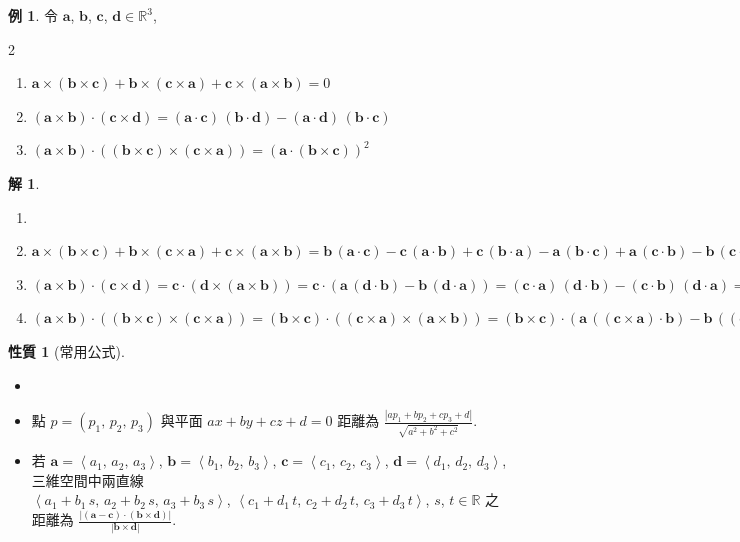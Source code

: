 \documentclass[12pt]{extarticle}
\newcommand{\ds}{\displaystyle}
\newcommand{\llt}{\left\langle}
\newcommand{\rgt}{\right\rangle}
\theoremstyle{definition}
\newtheorem*{prp}{性質}
\newtheorem*{ex}{例}
\newtheorem*{sol}{解}
\newcommand{\va}{\mathbf{a}}
\newcommand{\vb}{\mathbf{b}}
\newcommand{\vc}{\mathbf{c}}
\newcommand{\vd}{\mathbf{d}}
\begin{document}
\begin{ex} 令 $\va$, $\vb$, $\vc$, $\vd\in\mathbb{R}^3$,
  \begin{multicols}{2}
    \begin{enumerate}\setlength{\itemsep}{0pt}
      \item $\va\times(\vb\times\vc) + \vb\times(\vc\times\va) + \vc\times(\va\times\vb) = 0$
      \item $(\va\times\vb)\cdot(\vc\times\vd) = (\va\cdot\vc)\,(\vb\cdot\vd) - (\va\cdot\vd)\,(\vb\cdot\vc)$
      \item $(\va\times\vb)\cdot\left((\vb\times\vc)\times(\vc\times\va) \right) = \left(\va\cdot(\vb\times\vc)\right)^2$
    \end{enumerate} 
  \end{multicols}
\end{ex}
\begin{sol}
  \begin{enumerate}\setlength{\itemsep}{0pt}
    \item[]
    \item $\va\times(\vb\times\vc) + \vb\times(\vc\times\va) + \vc\times(\va\times\vb) = \vb\,(\va\cdot\vc) - \vc\,(\va\cdot\vb) + \vc\,(\vb\cdot\va) - \va\,(\vb\cdot\vc) + \va\,(\vc\cdot\vb) - \vb\,(\vc\cdot\va) = 0$
    \item $(\va\times\vb)\cdot(\vc\times\vd) = \vc\cdot(\vd\times(\va\times\vb)) = \vc\cdot\left(\va\,(\vd\cdot\vb) - \vb\,(\vd\cdot\va)\right) = (\vc\cdot\va)\,(\vd\cdot\vb) - (\vc\cdot\vb)\,(\vd\cdot\va)  = (\va\cdot\vc)\,(\vb\cdot\vd) - (\va\cdot\vd)\,(\vb\cdot\vc)$
    \item $(\va\times\vb)\cdot\left((\vb\times\vc)\times(\vc\times\va)\right) = (\vb\times\vc)\cdot\left((\vc\times\va)\times(\va\times\vb)\right) = (\vb\times\vc)\cdot\left(\va\,\left((\vc\times\va)\cdot\vb\right) - \vb\,\left((\vc\times\va)\cdot\va\right)\right) = (\vb\times\vc)\cdot(\va\,\left((\vc\times\va)\cdot\vb\right)) = \left(\va\cdot(\vb\times\vc)\right)^2$
  \end{enumerate} 
\end{sol}

\begin{prp}[常用公式] 
  \begin{itemize}\setlength{\itemsep}{0pt}
    \item[]
    \item 點 $p = (p_1,\,p_2,\,p_3)$ 與平面 $ax + by + cz + d = 0$ 距離為 $\ds\frac{|a p_1 + b p_2 + c p_3 + d|}{\sqrt{a^2 + b^2 + c^2}}$. 
    \item 若 $\va = \llt a_1,\,a_2,\,a_3\rgt$, $\vb = \llt b_1,\,b_2,\,b_3\rgt$, $\vc = \llt c_1,\,c_2,\,c_3\rgt$, $\vd = \llt d_1,\,d_2,\,d_3\rgt$, 三維空間中兩直線 \\$\ds\llt a_1 + b_1\,s,\,a_2 + b_2\,s,\,a_3 + b_3\,s\rgt$, $\ds\llt c_1 + d_1\,t,\,c_2 + d_2\,t,\,c_3 + d_3\,t \rgt$, $s$, $t\in\mathbb{R}$ 之距離為 $\ds\frac{|(\va - \vc)\cdot(\vb\times\vd)|}{|\vb\times\vd|}$. 
  \end{itemize}
\end{prp}
\end{document}
